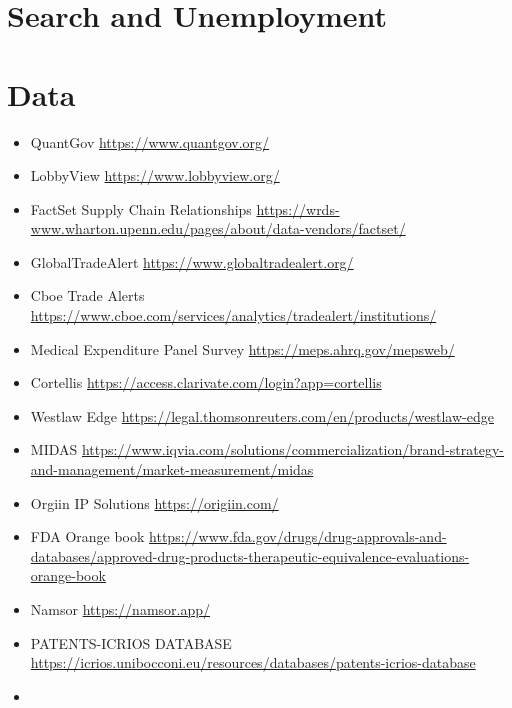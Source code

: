     \subsection{\cite{AdaoBerajaPandalaiNayar2020}}

\section{Search and Unemployment}
    \subsection{\cite{Shimer2005}}

\newpage
\section{Data}
\begin{itemize}
    \item QuantGov \url{https://www.quantgov.org/}
    \item LobbyView \url{https://www.lobbyview.org/}
    \item FactSet Supply Chain Relationships \url{https://wrds-www.wharton.upenn.edu/pages/about/data-vendors/factset/}
    \item GlobalTradeAlert \url{https://www.globaltradealert.org/}
    \item Cboe Trade Alerts \url{https://www.cboe.com/services/analytics/tradealert/institutions/}
    \item Medical Expenditure Panel Survey \url{https://meps.ahrq.gov/mepsweb/}
    \item Cortellis \url{https://access.clarivate.com/login?app=cortellis}
    \item Westlaw Edge \url{https://legal.thomsonreuters.com/en/products/westlaw-edge}
    \item MIDAS \url{https://www.iqvia.com/solutions/commercialization/brand-strategy-and-management/market-measurement/midas}
    \item Orgiin IP Solutions \url{https://origiin.com/}
    \item FDA Orange book \url{https://www.fda.gov/drugs/drug-approvals-and-databases/approved-drug-products-therapeutic-equivalence-evaluations-orange-book}
    \item Namsor \url{https://namsor.app/}
    \item PATENTS-ICRIOS DATABASE \url{https://icrios.unibocconi.eu/resources/databases/patents-icrios-database}
    \item 
\end{itemize}


\newpage

\footnotesize



